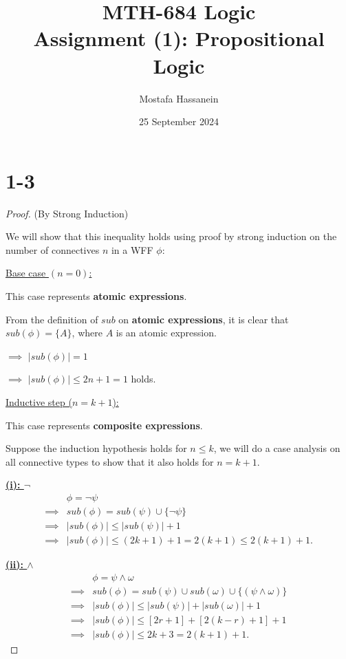 \documentclass{article}
\author{Mostafa Hassanein}
\title{
  MTH-684 Logic \\
  Assignment (1): Propositional Logic}
\date{25 September 2024}
\begin{document}
\maketitle
\newpage

\section*{1-3}

\begin{proof}(By Strong Induction)

  We will show that this inequality holds using proof by strong induction on the number of connectives $n$ in a WFF $\phi$:
  \newline

  \underline{Base case $(n = 0)$:}
  \newline

  This case represents \textbf{atomic expressions}.

  From the definition of $sub$ on \textbf{atomic expressions}, it is clear that $sub(\phi) = \{A\}$, where $A$ is an atomic expression.

  \noindent
  $\implies$
  $|sub(\phi)| = 1$

  \noindent
  $\implies$
  $|sub(\phi)| \leq 2n + 1 = 1$ holds.
  \newline

  \underline{Inductive step ($n = k+1$):}
  \newline

  This case represents \textbf{composite expressions}.

  Suppose the induction hypothesis holds for $n \leq k$, we will do a case analysis on all connective types to show that it also holds for $n = k+1$.
  \newline

  \noindent
  \textbf{\underline{(i): $\lnot$}}
  \begin{align*}
    &\phi = \lnot \psi \\
    \implies& sub(\phi) = sub(\psi) \cup \{ \lnot \psi\} \\
    \implies& |sub(\phi)| \leq |sub(\psi)| + 1 \\
    \implies& |sub(\phi)| \leq (2k + 1) + 1 = 2(k+1) \leq 2(k+1) + 1.
  \end{align*}


  \noindent
  \textbf{\underline{(ii): $\land$}} 
  \begin{align*}
    &\phi = \psi \land \omega \\
    \implies& sub(\phi) = sub(\psi) \cup sub(\omega) \cup \{ (\psi \land \omega) \} \\
    \implies& |sub(\phi)| \leq |sub(\psi)| + |sub(\omega)| + 1 \\
    \implies& |sub(\phi)| \leq [2r + 1] + [2(k-r) + 1] + 1 \\
    \implies& |sub(\phi)| \leq 2k + 3 = 2(k+1) + 1.
  \end{align*}



\end{proof}
\end{document}
